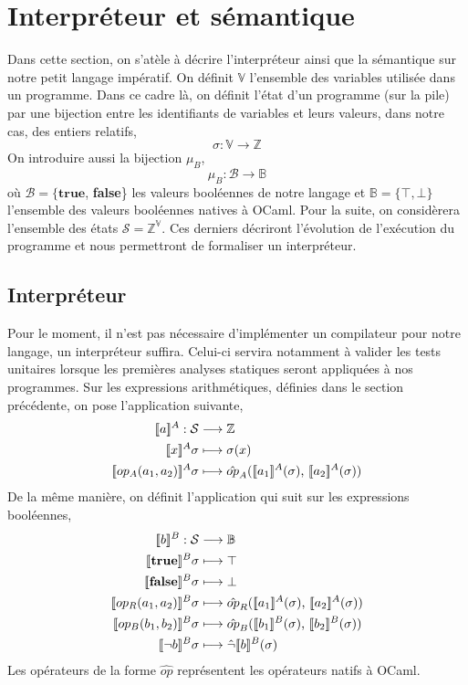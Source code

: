 \documentclass[a4paper, 12pt]{article}
\begin{document}
\begin{center}\end{center}

\section{Interpréteur et sémantique}
Dans cette section, on s'atèle à décrire l'interpréteur ainsi que la sémantique sur notre petit langage impératif. On définit
$\mathbb{V}$ l'ensemble des variables utilisée dans un programme.
Dans ce cadre là, on définit l'état d'un programme (sur la pile) par une bijection entre les identifiants de variables et leurs valeurs, 
dans notre cas, des entiers relatifs,
\[\sigma : \mathbb{V} \longrightarrow \mathbb{Z}\]
On introduire aussi la bijection $\mu_B$,
\[\mu_B : \mathcal{B} \longrightarrow \mathbb{B}\]
où $\mathcal{B} = \{\textbf{true}$, \textbf{false}\} les valeurs booléennes de notre langage et $\mathbb{B} = \{\top, \bot\}$ 
l'ensemble des valeurs booléennes natives à OCaml. Pour la suite, on considèrera l'ensemble des états $\mathcal{S} = \mathbb{Z}^\mathbb{V}$.
Ces derniers décriront l'évolution de l'exécution du programme et nous permettront de formaliser un interpréteur.

\subsection{Interpréteur}
Pour le moment, il n'est pas nécessaire d'implémenter un compilateur pour notre langage, un interpréteur suffira.
Celui-ci servira notamment à valider les tests unitaires lorsque les premières analyses statiques seront appliquées
à nos programmes.
Sur les expressions arithmétiques, définies dans le section précédente, on pose l'application suivante,
\begin{align*}
	\intrfun{a}{A}:\mathcal{S}&\longrightarrow\mathbb{Z}\\
	\intrfun{x}{A}\sigma&\longmapsto\sigma(x)\\
	\intrfun{op_A(a_1, a_2)}{A}\sigma&\longmapsto\hat{op}_A(\intr{a_1}{A}{\sigma}\text{, }\intr{a_2}{A}{\sigma})\\
\end{align*}
De la même manière, on définit l'application qui suit sur les expressions booléennes,
\begin{align*}
	\intrfun{b}{B}:\mathcal{S}&\longrightarrow\mathbb{B}\\	
	\intrfun{\textbf{true}}{B}\sigma&\longmapsto\top\\
	\intrfun{\textbf{false}}{B}\sigma&\longmapsto\bot\\
	\intrfun{op_R(a_1, a_2)}{B}\sigma &\longmapsto \hat{op}_R(\intr{a_1}{A}{\sigma}\text{, }\intr{a_2}{A}{\sigma})\\
	\intrfun{op_B(b_1, b_2)}{B}\sigma&\longmapsto \hat{op}_B(\intr{b_1}{B}{\sigma}\text{, }\intr{b_2}{B}{\sigma})\\
	\intrfun{\neg b}{B}\sigma&\longmapsto\hat{\neg}\intr{b}{B}{\sigma}
\end{align*}
Les opérateurs de la forme $\hat{op}$ représentent les opérateurs natifs à OCaml.
\end{document}
